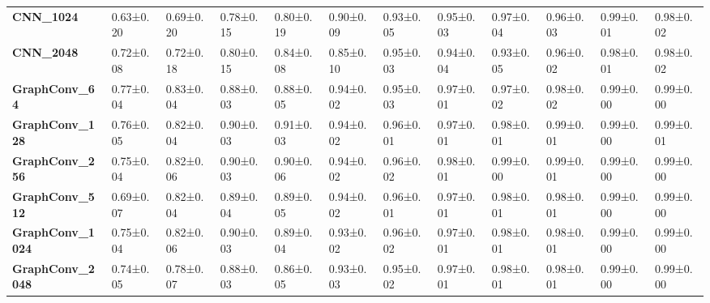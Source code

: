 \begin{tabular}{llllllllllll}
\textbf{CNN\_1024      } &   0.63±0.20 &  0.69±0.20 &  0.78±0.15 &  0.80±0.19 &  0.90±0.09 &  0.93±0.05 &  0.95±0.03 &  0.97±0.04 &  0.96±0.03 &   0.99±0.01 &   0.98±0.02 \\
\textbf{CNN\_2048      } &   0.72±0.08 &  0.72±0.18 &  0.80±0.15 &  0.84±0.08 &  0.85±0.10 &  0.95±0.03 &  0.94±0.04 &  0.93±0.05 &  0.96±0.02 &   0.98±0.01 &   0.98±0.02 \\
\textbf{GraphConv\_64  } &   0.77±0.04 &  0.83±0.04 &  0.88±0.03 &  0.88±0.05 &  0.94±0.02 &  0.95±0.03 &  0.97±0.01 &  0.97±0.02 &  0.98±0.02 &   0.99±0.00 &   0.99±0.00 \\
\textbf{GraphConv\_128 } &   0.76±0.05 &  0.82±0.04 &  0.90±0.03 &  0.91±0.03 &  0.94±0.02 &  0.96±0.01 &  0.97±0.01 &  0.98±0.01 &  0.99±0.01 &   0.99±0.00 &   0.99±0.01 \\
\textbf{GraphConv\_256 } &   0.75±0.04 &  0.82±0.06 &  0.90±0.03 &  0.90±0.06 &  0.94±0.02 &  0.96±0.02 &  0.98±0.01 &  0.99±0.00 &  0.99±0.01 &   0.99±0.00 &   0.99±0.00 \\
\textbf{GraphConv\_512 } &   0.69±0.07 &  0.82±0.04 &  0.89±0.04 &  0.89±0.05 &  0.94±0.02 &  0.96±0.01 &  0.97±0.01 &  0.98±0.01 &  0.98±0.01 &   0.99±0.00 &   0.99±0.00 \\
\textbf{GraphConv\_1024} &   0.75±0.04 &  0.82±0.06 &  0.90±0.03 &  0.89±0.04 &  0.93±0.02 &  0.96±0.02 &  0.97±0.01 &  0.98±0.01 &  0.98±0.01 &   0.99±0.00 &   0.99±0.00 \\
\textbf{GraphConv\_2048} &   0.74±0.05 &  0.78±0.07 &  0.88±0.03 &  0.86±0.05 &  0.93±0.03 &  0.95±0.02 &  0.97±0.01 &  0.98±0.01 &  0.98±0.01 &   0.99±0.00 &   0.99±0.00 \\
\bottomrule
\end{tabular}
